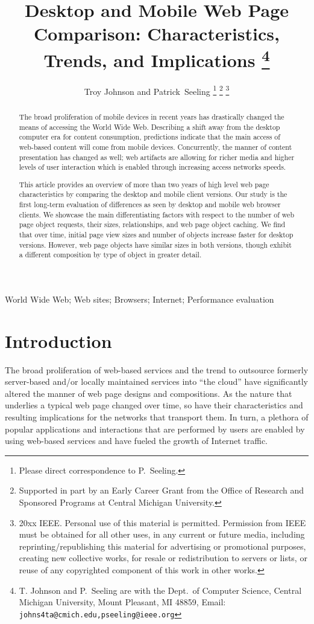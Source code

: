 \documentclass[journal,final]{IEEEtran}
\title{Desktop and Mobile Web Page Comparison: Characteristics, Trends, and Implications
	\thanks{T. Johnson and P.~Seeling are with the Dept.~of Computer Science,
		Central Michigan University, Mount Pleasant, MI 48859, Email: \texttt{johns4ta@cmich.edu,pseeling@ieee.org}}
}
\author{Troy Johnson and Patrick~Seeling
	\thanks{Please direct correspondence to P.~Seeling.}
	\thanks{Supported in part by an Early Career Grant from the Office of Research and Sponsored Programs at Central Michigan University.}
	\thanks{\textcopyright 20xx IEEE. Personal use of this material is permitted. Permission from IEEE must be obtained for all other uses, in any current or future media, including reprinting/republishing this material for advertising or promotional purposes, creating new collective works, for resale or redistribution to servers or lists, or reuse of any copyrighted component of this work in other works.}
}
\begin{document}
\maketitle

\begin{abstract}\boldmath
The broad proliferation of mobile devices in recent years has drastically changed the means of accessing the World Wide Web.
Describing a shift away from the desktop computer era for content consumption, predictions indicate that the main access of web-based content will come from mobile devices.
Concurrently, the manner of content presentation has changed as well; web artifacts are allowing for richer media and higher levels of user interaction which is enabled through increasing access networks speeds.

This article provides an overview of more than two years of high level web page characteristics by comparing the desktop and mobile client versions.
Our study is the first long-term evaluation of differences as seen by desktop and mobile web browser clients.
We showcase the main differentiating factors with respect to the number of web page object requests, their sizes, relationships, and web page object caching. We find that over time, initial page view sizes and number of objects increase faster for desktop versions. However, web page objects have similar sizes in both versions, though exhibit a different composition by type of object in greater detail.

\end{abstract}

\begin{IEEEkeywords}
World Wide Web; Web sites; Browsers; Internet; Performance evaluation
\end{IEEEkeywords}


\section{Introduction} 
\label{s:intro}

The broad proliferation of web-based services and the trend to outsource formerly server-based and/or locally maintained services into ``the cloud'' have significantly altered the manner of web page designs and compositions.
As the nature that underlies a typical web page changed over time, so have their characteristics and resulting implications for the networks that transport them.
In turn, a plethora of popular applications and interactions that are performed by users are enabled by using web-based services and have fueled the growth of Internet traffic.
\end{document}
